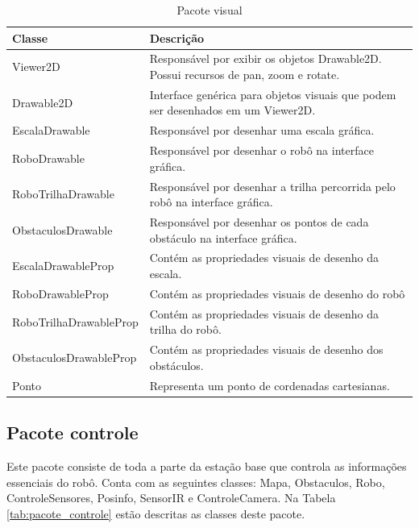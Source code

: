 \begin{table}[h]
  \centering
  \caption{Pacote visual}
    \begin{tabular}{p{6cm}p{8cm}}
    \toprule
    \textbf{Classe} & \textbf{Descrição} \\ \hline
    \midrule
    Viewer2D & Responsável por exibir os objetos Drawable2D. Possui recursos de pan, zoom e rotate.   \\ \hline
    Drawable2D & Interface genérica para objetos visuais que podem ser desenhados em um Viewer2D. \\ \hline
    EscalaDrawable & Responsável por desenhar uma escala gráfica. \\ \hline
    RoboDrawable & Responsável por desenhar o robô na interface gráfica. \\ \hline
    RoboTrilhaDrawable & Responsável por desenhar a trilha percorrida pelo robô na interface gráfica. \\ \hline
    ObstaculosDrawable & Responsável por desenhar os pontos de cada obstáculo na interface gráfica. \\ \hline
    EscalaDrawableProp & Contém as propriedades visuais de desenho da escala. \\ \hline
    RoboDrawableProp & Contém as propriedades visuais de desenho do robô \\ \hline
    RoboTrilhaDrawableProp & Contém as propriedades visuais de desenho da trilha do robô. \\ \hline
    ObstaculosDrawableProp & Contém as propriedades visuais de desenho dos obstáculos. \\ \hline
    Ponto & Representa um ponto de cordenadas cartesianas. \\ \hline
    \bottomrule
    \end{tabular}%
  \label{tab:pacote_visual}%
\end{table}%

\subsection{Pacote controle}

Este pacote consiste de toda a parte da estação base que controla as informações essenciais do robô. Conta com as seguintes classes: Mapa, Obstaculos, Robo, ControleSensores, Posinfo, SensorIR e ControleCamera. Na Tabela \ref{tab:pacote_controle} estão descritas as classes deste pacote.

